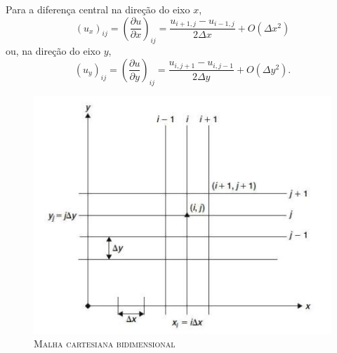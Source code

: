 Para a diferença central na direção do eixo $x$,
\begin{equation} \label{cedir_x}
(u_x)_{ij} = \left( \frac{ \partial u}{ \partial x} \right)_{ij} = \frac{ u_{i+1,j} - u_{i-1,j}}{2 \Delta x} + O( \Delta x^2)
\end{equation}
ou, na direção do eixo $y$,
\begin{equation} \label{atdir_y}
(u_y)_{ij} = \left( \frac{ \partial u}{ \partial y} \right)_{ij} = \frac{ u_{i,j+1} - u_{i,j-1}}{2 \Delta y} + O( \Delta y^2) .
\end{equation}

\begin{figure}[H]
	\centering
	\includegraphics[scale=1]{figuras/malha_2D.jpg}
	\caption{\textsc{Malha cartesiana bidimensional}}
	\vspace{-0.1cm}
	\label{fig:malha_2D}
\end{figure}

